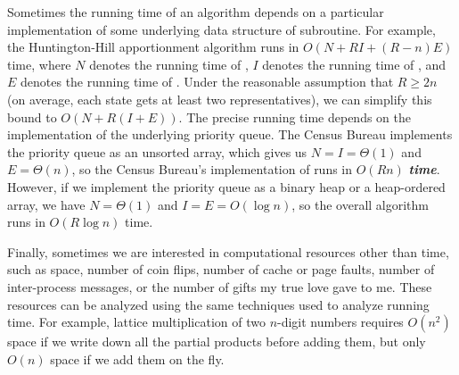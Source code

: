Sometimes the running time of an algorithm depends on a particular implementation of some underlying data structure of subroutine. For example, the Huntington-Hill apportionment algorithm  runs in $O(N + RI + (R - n)E)$ time, where $N$ denotes the running time of , $I$ denotes the running time of , and $E$ denotes the running time of . Under the reasonable assumption that $R \ge 2n$ (on average, each state gets at least two representatives), we can simplify this bound to $O(N + R(I + E))$. The precise running time depends on the implementation of the underlying priority queue. The Census Bureau implements the priority queue as an unsorted array, which gives us $N = I = \Theta(1)$ and $E = \Theta(n)$, so the Census Bureau’s implementation of  runs in $O(Rn)$ \textbf{\textit{time}}. However, if we implement the priority queue as a binary heap or a heap-ordered array, we have $N = \Theta(1)$ and $I = E = O(\log n)$, so the overall algorithm runs in $O(R \log n)$ time.

Finally, sometimes we are interested in computational resources other than time, such as space, number of coin flips, number of cache or page faults, number of inter-process messages, or the number of gifts my true love gave to me. These resources can be analyzed using the same techniques used to analyze running time. For example, lattice multiplication of two $n$-digit numbers requires $O(n^2)$ space if we write down all the partial products before adding them, but only $O(n)$ space if we add them on the fly.


